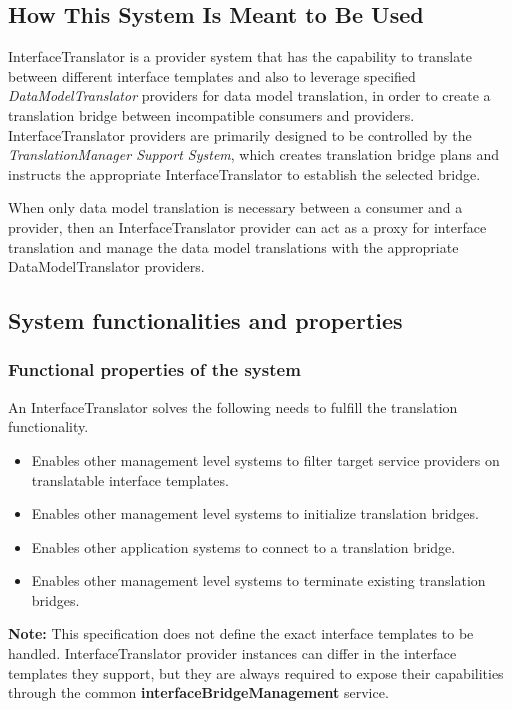 \documentclass[a4paper]{arrowhead}
\begin{document}
\subsection{How This System Is Meant to Be Used}
\label{sec:use}

InterfaceTranslator is a provider system that has the capability to translate between different interface templates and also to leverage specified \textit{DataModelTranslator} providers for data model translation, in order to create a translation bridge between incompatible consumers and providers. InterfaceTranslator providers are primarily designed to be controlled by the \textit{TranslationManager Support System}, which creates translation bridge plans and instructs the appropriate InterfaceTranslator to establish the selected bridge.

When only data model translation is necessary between a consumer and a provider, then an InterfaceTranslator provider can act as a proxy for interface translation and manage the data model translations with the appropriate DataModelTranslator providers.

\subsection{System functionalities and properties}
\label{sec:properties}

\subsubsection {Functional properties of the system}
An InterfaceTranslator solves the following needs to fulfill the translation functionality.

\begin{itemize}
    \item Enables other management level systems to filter target service providers on translatable interface templates.
    \item Enables other management level systems to initialize translation bridges.
    \item Enables other application systems to connect to a translation bridge.
    \item Enables other management level systems to terminate existing translation bridges.
\end{itemize}

\textbf{Note:} This specification does not define the exact interface templates to be handled. InterfaceTranslator provider instances can differ in the interface templates they support, but they are always required to expose their capabilities through the common \textbf{interfaceBridgeManagement} service.
\end{document}
